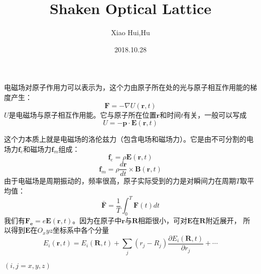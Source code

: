 \documentclass{article}
\title{Shaken Optical Lattice}
\author{Xiao Hui,Hu}
\date{2018.10.28}
\begin{document}
	\maketitle
	电磁场对原子作用力可以表示为，这个力由原子所在处的光与原子相互作用能的梯度产生：
	\begin{equation}
		\boldsymbol{F} = -\nabla U(\boldsymbol{r},t) \label{eq:1}
	\end{equation}
	$U$是电磁场与原子相互作用能。它与原子所在位置$\boldsymbol{r}$和时间$t$有关，一般可以写成
	\begin{equation}
		U = - \boldsymbol{p} \cdot \boldsymbol{E}(\boldsymbol{r},t) \label{eq:2}
	\end{equation}

	这个力本质上就是电磁场的洛伦兹力（包含电场和磁场力）。它是由不可分割的电场力$\boldsymbol{f}_e$和磁场力$\boldsymbol{f}_m$组成：
	\begin{equation}
		\boldsymbol{f}_e = \rho \boldsymbol{E}(\boldsymbol{r},t) \label{eq:3}
	\end{equation}
	\begin{equation}
		\boldsymbol{f}_m = \rho \frac{d\boldsymbol{r}}{dt} \times \boldsymbol{B}(\boldsymbol{r},t) \label{eq:4}
	\end{equation}
	由于电磁场是周期振动的，频率很高，原子实际受到的力是对瞬间力在周期$T$取平均值：
	\begin{equation}
		\bar{\boldsymbol{F}} = \frac{1}{T} \int_{0}^{T} \boldsymbol{F}(t)dt \label{eq:5}
	\end{equation}
	我们有$\boldsymbol{F_e} = e \boldsymbol{E}(\boldsymbol{r},t)$。因为在原子中$\boldsymbol{r}$与$\boldsymbol{R}$相距很小，可对$\boldsymbol{E}$在$\boldsymbol{R}$附近展开，
	所以得到$\boldsymbol{E}$在$O_xyz$坐标系中各个分量
	\begin{equation}
		E_i(\boldsymbol{r},t) = E_i(\boldsymbol{R},t) + \sum_j (r_j - R_j) \frac{\partial E_i(\boldsymbol{R},t)}{\partial r_j} + \cdots  \label{eq:6}
	\end{equation}
	\centerline{$(i,j = x,y,z)$}
\end{document}
